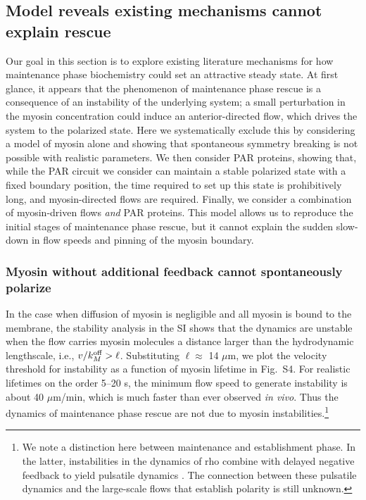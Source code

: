 \documentclass[11pt]{article}
\newcommand{\6}[1]{#1_{\text{6}}}
\newcommand{\3}[1]{#1_{\text{3}}}
\begin{document}
\subsection{Model reveals existing mechanisms cannot explain rescue }
Our goal in this section is to explore existing literature mechanisms for how maintenance phase biochemistry could set an attractive steady state. At first glance, it appears that the phenomenon of maintenance phase rescue is a consequence of an instability of the underlying system; a small perturbation in the myosin concentration could induce an anterior-directed flow, which drives the system to the polarized state. Here we systematically exclude this by considering a model of myosin alone and showing that spontaneous symmetry breaking is not possible with realistic parameters. We then consider PAR proteins, showing that, while the PAR circuit we consider can maintain a stable polarized state with a fixed boundary position, the time required to set up this state is prohibitively long, and myosin-directed flows are required. Finally, we consider a combination of myosin-driven flows \emph{and} PAR proteins. This model allows us to reproduce the initial stages of maintenance phase rescue, but it cannot explain the sudden slow-down in flow speeds and pinning of the myosin boundary.

\subsubsection{Myosin without additional feedback cannot spontaneously polarize \label{sec:myosin}}

In the case when diffusion of myosin is negligible and all myosin is bound to the membrane, the stability analysis in the SI shows that the dynamics are unstable when the flow carries myosin molecules a distance larger than the hydrodynamic lengthscale, i.e., $v / k^\text{off}_M > \ell$. Substituting $\ell \approx$ 14 $\mu$m, we plot the velocity threshold for instability as a function of myosin lifetime in Fig.\ S4. For realistic lifetimes on the order 5--20 s, the minimum flow speed to generate instability is about 40 $\mu$m/min, which is much faster than ever observed \emph{in vivo}. Thus the dynamics of maintenance phase rescue are not due to myosin instabilities.\footnote{We note a distinction here between maintenance and establishment phase. In the latter, instabilities in the dynamics of rho combine with delayed negative feedback to yield pulsatile dynamics \citep{nishikawa2017controlling, michaux2018excitable, michaud2022versatile}. The connection between these pulsatile dynamics and the large-scale flows that establish polarity is still unknown.}
\end{document}
